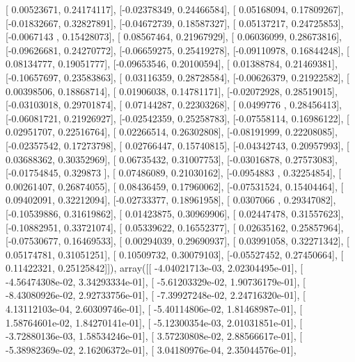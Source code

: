 \documentclass{article}
\begin{document}
       [ 0.00523671,  0.24174117],
       [-0.02378349,  0.24466584],
       [ 0.05168094,  0.17809267],
       [-0.01832667,  0.32827891],
       [-0.04672739,  0.18587327],
       [ 0.05137217,  0.24725853],
       [-0.0067143 ,  0.15428073],
       [ 0.08567464,  0.21967929],
       [ 0.06036099,  0.28673816],
       [-0.09626681,  0.24270772],
       [-0.06659275,  0.25419278],
       [-0.09110978,  0.16844248],
       [ 0.08134777,  0.19051777],
       [-0.09653546,  0.20100594],
       [ 0.01388784,  0.21469381],
       [-0.10657697,  0.23583863],
       [ 0.03116359,  0.28728584],
       [-0.00626379,  0.21922582],
       [ 0.00398506,  0.18868714],
       [ 0.01906038,  0.14781171],
       [-0.02072928,  0.28519015],
       [-0.03103018,  0.29701874],
       [ 0.07144287,  0.22303268],
       [ 0.0499776 ,  0.28456413],
       [-0.06081721,  0.21926927],
       [-0.02542359,  0.25258783],
       [-0.07558114,  0.16986122],
       [ 0.02951707,  0.22516764],
       [ 0.02266514,  0.26302808],
       [-0.08191999,  0.22208085],
       [-0.02357542,  0.17273798],
       [ 0.02766447,  0.15740815],
       [-0.04342743,  0.20957993],
       [ 0.03688362,  0.30352969],
       [ 0.06735432,  0.31007753],
       [-0.03016878,  0.27573083],
       [-0.01754845,  0.329873  ],
       [ 0.07486089,  0.21030162],
       [-0.0954883 ,  0.32254854],
       [ 0.00261407,  0.26874055],
       [ 0.08436459,  0.17960062],
       [-0.07531524,  0.15404464],
       [ 0.09402091,  0.32212094],
       [-0.02733377,  0.18961958],
       [ 0.0307066 ,  0.29347082],
       [-0.10539886,  0.31619862],
       [ 0.01423875,  0.30969906],
       [ 0.02447478,  0.31557623],
       [-0.10882951,  0.33721074],
       [ 0.05339622,  0.16552377],
       [ 0.02635162,  0.25857964],
       [-0.07530677,  0.16469533],
       [ 0.00294039,  0.29690937],
       [ 0.03991058,  0.32271342],
       [ 0.05174781,  0.31051251],
       [ 0.10509732,  0.30079103],
       [-0.05527452,  0.27450664],
       [ 0.11422321,  0.25125842]]), array([[ -4.04021713e-03,   2.02304495e-01],
       [ -4.56474308e-02,   3.34293334e-01],
       [ -5.61203329e-02,   1.90736179e-01],
       [ -8.43080926e-02,   2.92733756e-01],
       [ -7.39927248e-02,   2.24716320e-01],
       [  4.13112103e-04,   2.60309746e-01],
       [ -5.40114806e-02,   1.81468987e-01],
       [  1.58764601e-02,   1.84270141e-01],
       [ -5.12300354e-03,   2.01031851e-01],
       [ -3.72880136e-03,   1.58534246e-01],
       [  3.57230808e-02,   2.88566617e-01],
       [ -5.38982369e-02,   2.16206372e-01],
       [  3.04180976e-04,   2.35044576e-01],
\end{document}
